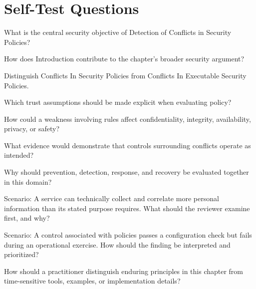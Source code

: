 \documentclass[11pt,letterpaper]{article}
\begin{document}
\section*{Self-Test Questions}
\begin{CornellRecallList}
\item What is the central security objective of Detection of Conflicts in Security Policies?
\item How does Introduction contribute to the chapter's broader security argument?
\item Distinguish Conflicts In Security Policies from Conflicts In Executable Security Policies.
\item Which trust assumptions should be made explicit when evaluating policy?
\item How could a weakness involving rules affect confidentiality, integrity, availability, privacy, or safety?
\item What evidence would demonstrate that controls surrounding conflicts operate as intended?
\item Why should prevention, detection, response, and recovery be evaluated together in this domain?
\item Scenario: A service can technically collect and correlate more personal information than its stated purpose requires. What should the reviewer examine first, and why?
\item Scenario: A control associated with policies passes a configuration check but fails during an operational exercise. How should the finding be interpreted and prioritized?
\item How should a practitioner distinguish enduring principles in this chapter from time-sensitive tools, examples, or implementation details?
\end{CornellRecallList}
\end{document}
